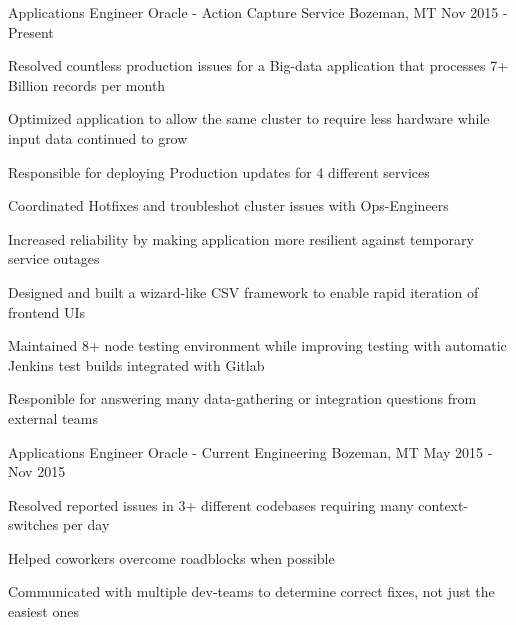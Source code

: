 

\begin{cventries}

  \cventry
    {Applications Engineer} %
    {Oracle - Action Capture Service} %
    {Bozeman, MT} %
    {Nov 2015 - Present} %
    {
      \begin{cvitems} %
        \item {Resolved countless production issues for a Big-data application that processes 7+ Billion records per month}
        \item {Optimized application to allow the same cluster to require less hardware while input data continued to grow}
        \item {Responsible for deploying Production updates for 4 different services}
        \item {Coordinated Hotfixes and troubleshot cluster issues with Ops-Engineers}
        \item {Increased reliability by making application more resilient against temporary service outages}
        \item {Designed and built a wizard-like CSV framework to enable rapid iteration of frontend UIs}
        \item {Maintained 8+ node testing environment while improving testing with automatic Jenkins test builds integrated with Gitlab}
        \item {Responible for answering many data-gathering or integration questions from external teams}
      \end{cvitems}
    }

  \cventry
    {Applications Engineer} %
    {Oracle - Current Engineering} %
    {Bozeman, MT} %
    {May 2015 - Nov 2015} %
    {
      \begin{cvitems} %
        \item {Resolved reported issues in 3+ different codebases requiring many context-switches per day}
        \item {Helped coworkers overcome roadblocks when possible}
        \item {Communicated with multiple dev-teams to determine correct fixes, not just the easiest ones}
      \end{cvitems}
    }


\end{cventries}
